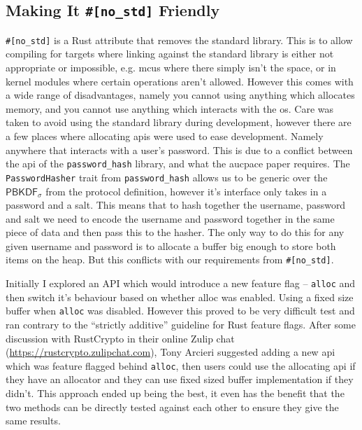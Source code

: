 \subsection{Making It \texttt{\#[no\_std]} Friendly}
\verb|#[no_std]| is a Rust attribute that removes the standard library.
This is to allow compiling for targets where linking against the standard library is either not appropriate or impossible, e.g. \glspl{mcu} where there simply isn't the space, or in kernel modules where certain operations aren't allowed.
However this comes with a wide range of disadvantages, namely you cannot using anything which allocates memory, and you cannot use anything which interacts with the \gls{os}.
Care was taken to avoid using the standard library during development, however there are a few places where allocating \glspl{api} were used to ease development.
Namely anywhere that interacts with a user's password.
This is due to a conflict between the \gls{api} of the \texttt{password\_hash} library, and what the \gls{aucpace} paper requires.
The \texttt{PasswordHasher} trait from \texttt{password\_hash} allows us to be generic over the $\textsf{PBKDF}_{\sigma}$ from the protocol definition, however it's interface only takes in a password and a salt.
This means that to hash together the username, password and salt we need to encode the username and password together in the same piece of data and then pass this to the hasher.
The only way to do this for any given username and password is to allocate a buffer big enough to store both items on the heap.
But this conflicts with our requirements from \verb|#[no_std]|.

Initially I explored an API which would introduce a new feature flag -- \texttt{alloc} and then switch it's behaviour based on whether alloc was enabled.
Using a fixed size buffer when \texttt{alloc} was disabled.
However this proved to be very difficult test and ran contrary to the \enquote{strictly additive} guideline for Rust feature flags.
After some discussion with RustCrypto in their online Zulip chat (\url{https://rustcrypto.zulipchat.com}), Tony Arcieri
suggested adding a new \gls{api} which was feature flagged behind \texttt{alloc}, then users could use the allocating \gls{api} if they have an allocator and they can use fixed sized buffer implementation if they didn't.
This approach ended up being the best, it even has the benefit that the two methods can be directly tested against each other to ensure they give the same results.

